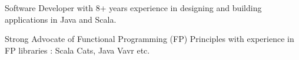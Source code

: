 \begin{cvitems}
\sectionspace
\sectionspace
\vspace{1mm}
	\fontsize{11pt}{1.4em}\bodyfontlight\upshape\color{text}
        \item {Software Developer with 8+ years experience in designing and building applications in Java and Scala.}
        \item {Strong Advocate of Functional Programming (FP) Principles with experience in FP libraries : Scala Cats, Java Vavr etc.}
        \end{cvitems}
\vspace{1mm}
\sectionspace
